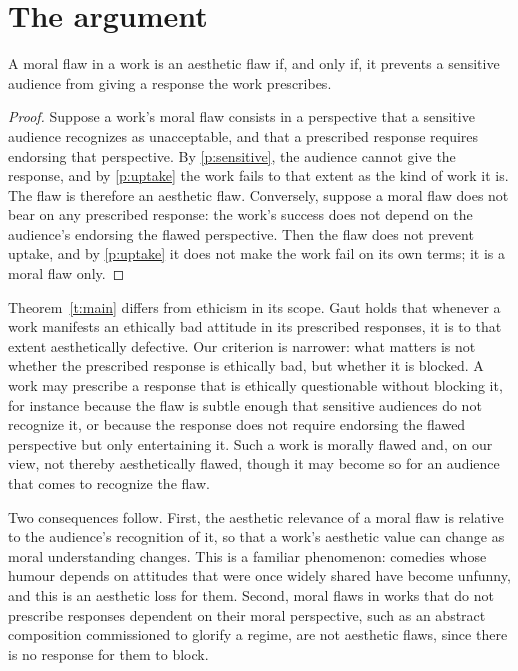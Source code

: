 \documentclass{situationist-preprint}
\begin{document}
\section{The argument}

\begin{theorem}\label{t:main}
A moral flaw in a work is an aesthetic flaw if, and only if, it prevents a sensitive audience from giving a response the work prescribes.
\end{theorem}

\begin{proof}
Suppose a work's moral flaw consists in a perspective that a sensitive audience recognizes as unacceptable, and that a prescribed response requires endorsing that perspective. By \ref{p:sensitive}, the audience cannot give the response, and by \ref{p:uptake} the work fails to that extent as the kind of work it is. The flaw is therefore an aesthetic flaw. Conversely, suppose a moral flaw does not bear on any prescribed response: the work's success does not depend on the audience's endorsing the flawed perspective. Then the flaw does not prevent uptake, and by \ref{p:uptake} it does not make the work fail on its own terms; it is a moral flaw only.
\end{proof}

Theorem~\ref{t:main} differs from ethicism in its scope. Gaut holds that whenever a work manifests an ethically bad attitude in its prescribed responses, it is to that extent aesthetically defective. Our criterion is narrower: what matters is not whether the prescribed response is ethically bad, but whether it is blocked. A work may prescribe a response that is ethically questionable without blocking it, for instance because the flaw is subtle enough that sensitive audiences do not recognize it, or because the response does not require endorsing the flawed perspective but only entertaining it. Such a work is morally flawed and, on our view, not thereby aesthetically flawed, though it may become so for an audience that comes to recognize the flaw.

Two consequences follow. First, the aesthetic relevance of a moral flaw is relative to the audience's recognition of it, so that a work's aesthetic value can change as moral understanding changes. This is a familiar phenomenon: comedies whose humour depends on attitudes that were once widely shared have become unfunny, and this is an aesthetic loss for them. Second, moral flaws in works that do not prescribe responses dependent on their moral perspective, such as an abstract composition commissioned to glorify a regime, are not aesthetic flaws, since there is no response for them to block.
\end{document}
